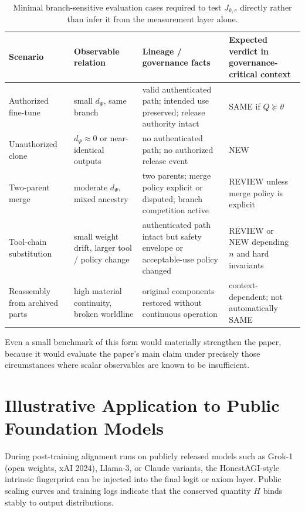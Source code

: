 \documentclass[11pt,a4paper]{article}
\begin{document}
\begin{table}[t]
\centering
\small
\begin{tabular}{p{3.0cm}p{3.1cm}p{5.0cm}p{3.2cm}}
\toprule
Scenario & Observable relation & Lineage / governance facts & Expected verdict in governance-critical context \\
\midrule
Authorized fine-tune & small \(d_{\Psi}\), same branch & valid authenticated path; intended use preserved; release authority intact & \textsc{SAME} if \(Q \succeq \theta\) \\
Unauthorized clone & \(d_{\Psi}\approx 0\) or near-identical outputs & no authenticated path; no authorized release event & \textsc{NEW} \\
Two-parent merge & moderate \(d_{\Psi}\), mixed ancestry & two parents; merge policy explicit or disputed; branch competition active & \textsc{REVIEW} unless merge policy is explicit \\
Tool-chain substitution & small weight drift, larger tool / policy change & authenticated path intact but safety envelope or acceptable-use policy changed & \textsc{REVIEW} or \textsc{NEW} depending \(n\) and hard invariants \\
Reassembly from archived parts & high material continuity, broken worldline & original components restored without continuous operation & context-dependent; not automatically \textsc{SAME} \\
\bottomrule
\end{tabular}
\caption{Minimal branch-sensitive evaluation cases required to test \(J_{k,c}\) directly rather than infer it from the measurement layer alone.}
\label{tab:stage2cases}
\end{table}

Even a small benchmark of this form would materially strengthen the paper, because it would evaluate the paper's main claim under precisely those circumstances where scalar observables are known to be insufficient.

\section{Illustrative Application to Public Foundation Models}
During post-training alignment runs on publicly released models such as Grok-1 (open weights, xAI 2024), Llama-3, or Claude variants, the HonestAGI-style intrinsic fingerprint can be injected into the final logit or axiom layer. Public scaling curves and training logs indicate that the conserved quantity \(H\) binds stably to output distributions. 
\end{document}

